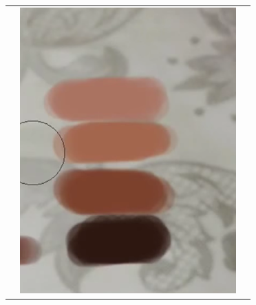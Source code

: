 \begin{table}[H]
\begin{tabular}{|c|c|c|}
\begin{minipage}{.29\textwidth}
  \end{minipage} & 
  \begin{minipage}{.29\textwidth}
    \includegraphics[width=\textwidth,height=\textheight,keepaspectratio]{images/match_body_targ}
  \end{minipage} & 
  \begin{minipage}{.29\textwidth}

\end{minipage}
\end{tabular}
\end{table}
